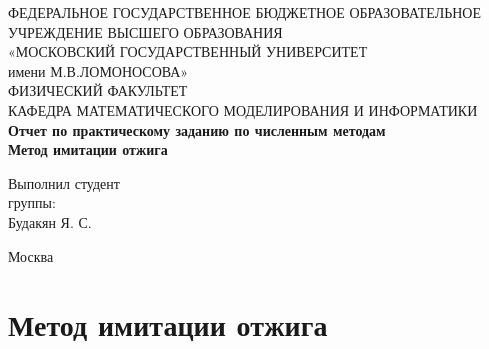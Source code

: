 \documentclass[a4paper]{article}
\begin{document}
	\begin{titlepage} %
		
		\begin{center}
			\footnotesize{ФЕДЕРАЛЬНОЕ ГОСУДАРСТВЕННОЕ БЮДЖЕТНОЕ ОБРАЗОВАТЕЛЬНОЕ }\\ 
			\footnotesize{УЧРЕЖДЕНИЕ ВЫСШЕГО ОБРАЗОВАНИЯ}\\
			\small{«МОСКОВСКИЙ ГОСУДАРСТВЕННЫЙ УНИВЕРСИТЕТ}\\
			\small{имени М.В.ЛОМОНОСОВА»}\\
			\hfill \break
			\normalsize{ФИЗИЧЕСКИЙ ФАКУЛЬТЕТ}\\
			\hfill \break
			\normalsize{КАФЕДРА МАТЕМАТИЧЕСКОГО МОДЕЛИРОВАНИЯ И ИНФОРМАТИКИ}\\
			\hfill \break
			\hfill \break
			\hfill \break
			\hfill \break
			\hfill \break
			\hfill \break
			\large{\textbf{Отчет по практическому заданию по численным методам}}\\
			\hfill \break
			\large{\textbf{Метод имитации отжига}}\\
		\end{center}
		
		\hfill \break
		
		\begin{flushright}
			Выполнил студент \\
			\hfill {} группы:\\
			\hfill \break
			Будакян Я. С.\\
			\hfill \break
			\hfill \break
			\hfill \break
		\end{flushright}
		
		\hfill \break
		\hfill \break
		\hfill \break
		\hfill \break
		\hfill \break
		\hfill \break
		
		\begin{center}
			Москва \\
			\hfill {} 
		\end{center}
		
		\thispagestyle{empty} %
		
		
	\end{titlepage}  %
	\setcounter{page}{2}
	\section{Метод имитации отжига}
\end{document}
